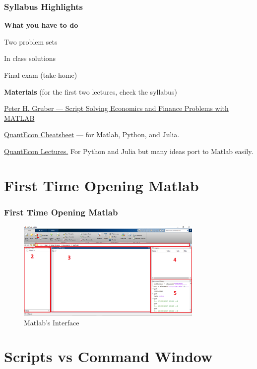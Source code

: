 \documentclass[11pt,xcolor={svgnames},aspectratio=169,usepdftitle=false]{beamer}
\let\toneitemize\itemize
\let\ttwoitemize\enditemize
\renewenvironment{itemize}{\toneitemize\addtolength{\itemsep}{1.35\baselineskip}}{\ttwoitemize}
\let\toneenumer\enumerate
\let\ttwoenumer\endenumerate
\renewenvironment{enumerate}{\toneenumer\addtolength{\itemsep}{1.35\baselineskip}}{\ttwoenumer}
\begin{document}
\begin{frame}
    \frametitle{Syllabus Highlights}
    \textbf{\alert{What you have to do}}
    \begin{enumerate}
        \item Two problem sets
        \item In class solutions
        \item Final exam (take-home)
    \end{enumerate}
    
    \textbf{\alert{Materials}} (for the first two lectures, check the syllabus)
    \begin{itemize}
        \item \href{https://people.lu.usi.ch/gruberp/MatlabMasterScript.pdf}{Peter H. Gruber --- Script Solving Economics and Finance Problems with MATLAB}
        \item \href{https://cheatsheets.quantecon.org/index.html}{QuantEcon Cheatsheet} ---  for Matlab, Python, and Julia.
        \item \href{https://quantecon.org/lectures/}{QuantEcon Lectures.} For Python and Julia but many ideas port to Matlab easily.
    \end{itemize}
\end{frame}

\section{First Time Opening Matlab}

\begin{frame}
    \frametitle{First Time Opening Matlab}
\begin{figure}
    \centering
    \includegraphics[width = 0.8\textwidth]{../figures/matlab_initial.PNG}
    \caption{Matlab's Interface}
    \label{fig:matlab_interface}
\end{figure}
\end{frame}

\section{Scripts vs Command Window}
\end{document}
